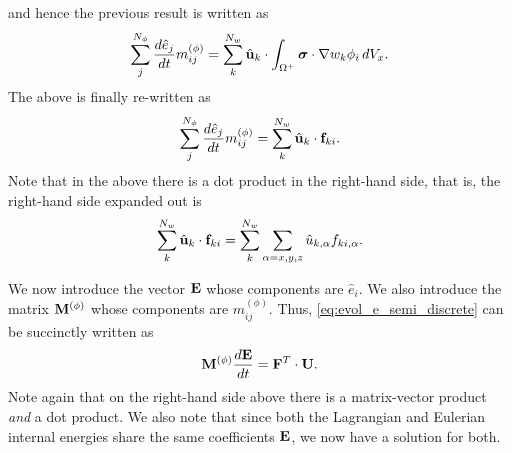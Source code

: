 \documentclass[11pt]{article}
\begin{document}
and hence the previous result is written as
\begin{equation}
    \sum_j^{N_\phi} \frac{d \hat{e}_j}{dt} m_{ij}^{(\phi)} = \sum_k^{N_w} \hat{\mathbf{u}}_k \cdot \int_{\Omega^+} \bm \sigma \cdot \nabla w_k \phi_i \, dV_x.
\end{equation}
The above is finally re-written as
\begin{equation}
    \label{eq:evol_e_semi_discrete}
    \sum_j^{N_\phi} \frac{d \hat{e}_j}{d t} m^{(\phi)}_{ij} = \sum_k^{N_w} \hat{\mathbf{u}}_k \cdot \mathbf{f}_{ki}.
\end{equation}
Note that in the above there is a dot product in the right-hand side, that is, the right-hand side expanded out is  
\begin{equation}
    \sum_k^{N_w} \hat{\mathbf{u}}_k \cdot \mathbf{f}_{ki} = \sum_k^{N_w} \sum_{\alpha=x,y,z} \hat{u}_{k,\alpha} f_{ki,\alpha}.
\end{equation}

We now introduce the vector $\mathbf{E}$ whose components are $\hat{e}_i$. We also introduce the matrix $\mathbf{M}^{(\phi)}$ whose components are $m_{ij}^{(\phi)}$. Thus, \cref{eq:evol_e_semi_discrete} can be succinctly written as
\begin{equation}
    \mathbf{M}^{(\phi)} \frac{d\mathbf{E}}{dt} = \mathbf{F}^T \cdot \mathbf{U}.
\end{equation}
Note again that on the right-hand side above there is a matrix-vector product \textit{and} a dot product. We also note that since both the Lagrangian and Eulerian internal energies share the same coefficients $\mathbf{E}$, we now have a solution for both.
\end{document}

